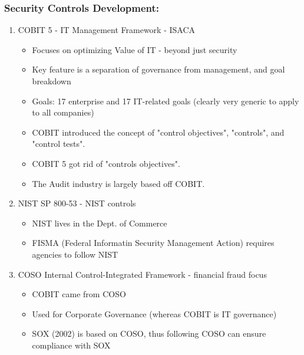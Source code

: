 \documentclass[11pt]{article}
\begin{document}
\subsubsection{Security Controls Development:}
\label{sec:org5dbde96}
\begin{enumerate}
\item COBIT 5 - IT Management Framework - ISACA
\label{sec:org292b5fc}
\begin{itemize}
\item Focuses on optimizing Value of IT - beyond just security
\item Key feature is a separation of governance from management, and goal breakdown
\item Goals: 17 enterprise and 17 IT-related goals (clearly very generic to apply to all companies)
\item COBIT introduced the concept of "control objectives", "controls", and "control tests".
\item COBIT 5 got rid of "controls objectives".
\item The Audit industry is largely based off COBIT.
\end{itemize}
\item NIST SP 800-53 - NIST controls
\label{sec:org5954a75}
\begin{itemize}
\item NIST lives in the Dept. of Commerce
\item FISMA (Federal Informatin Security Management Action) requires agencies to follow NIST
\end{itemize}
\item COSO Internal Control-Integrated Framework - financial fraud focus
\label{sec:orgeea25d5}
\begin{itemize}
\item COBIT came from COSO
\item Used for Corporate Governance (whereas COBIT is IT governance)
\item SOX (2002) is based on COSO, thus following COSO can ensure compliance with SOX
\end{itemize}
\end{enumerate}
\end{document}
